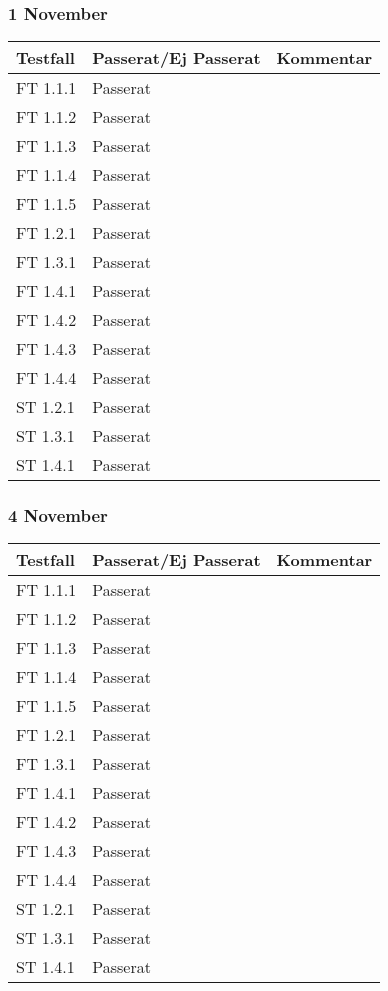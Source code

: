 \documentclass[a4paper]{article}
\begin{document}
\subsubsection{1 November}
\begin{tabular}{| l | l | p{9cm} |}
\hline
Testfall & Passerat/Ej Passerat & Kommentar\\
\hline
FT 1.1.1 & Passerat & \\
\hline
FT 1.1.2 & Passerat & \\
\hline
FT 1.1.3 & Passerat & \\
\hline
FT 1.1.4 & Passerat & \\
\hline
FT 1.1.5 & Passerat & \\
\hline
FT 1.2.1 & Passerat & \\
\hline
FT 1.3.1 & Passerat & \\
\hline
FT 1.4.1 & Passerat & \\
\hline
FT 1.4.2 & Passerat & \\
\hline
FT 1.4.3 & Passerat & \\
\hline
FT 1.4.4 & Passerat & \\
\hline
ST 1.2.1 & Passerat & \\
\hline
ST 1.3.1 & Passerat & \\
\hline
ST 1.4.1 & Passerat & \\
\hline
\end{tabular}

\subsubsection{4 November}
\begin{tabular}{| l | l | p{9cm} |}
\hline
Testfall & Passerat/Ej Passerat & Kommentar\\
\hline
FT 1.1.1 & Passerat & \\
\hline
FT 1.1.2 & Passerat & \\
\hline
FT 1.1.3 & Passerat & \\
\hline
FT 1.1.4 & Passerat & \\
\hline
FT 1.1.5 & Passerat & \\
\hline
FT 1.2.1 & Passerat & \\
\hline
FT 1.3.1 & Passerat & \\
\hline
FT 1.4.1 & Passerat & \\
\hline
FT 1.4.2 & Passerat & \\
\hline
FT 1.4.3 & Passerat & \\
\hline
FT 1.4.4 & Passerat & \\
\hline
ST 1.2.1 & Passerat & \\
\hline
ST 1.3.1 & Passerat & \\
\hline
ST 1.4.1 & Passerat & \\
\hline
\end{tabular}
\end{document}
